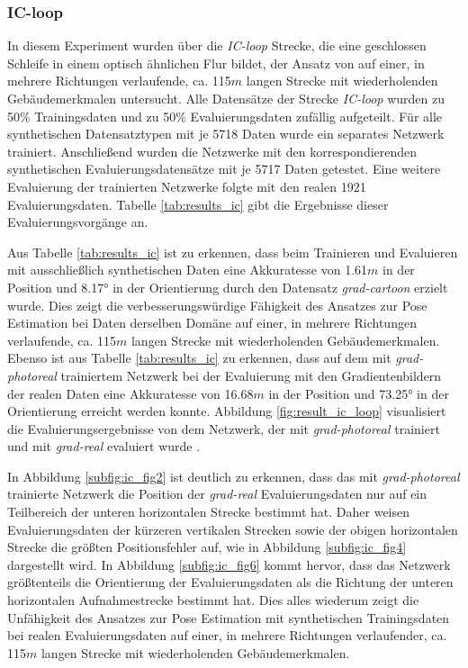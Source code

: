 \subsubsection{IC-loop}
In diesem Experiment wurden über die \textit{IC-loop} Strecke, die eine geschlossen Schleife in einem optisch ähnlichen Flur bildet, der Ansatz von \citet{acharyaBIMPoseNetIndoorCamera2019} auf einer, in mehrere Richtungen verlaufende, ca. 115$m$ langen Strecke mit wiederholenden Gebäudemerkmalen untersucht. Alle Datensätze der Strecke \textit{IC-loop} wurden zu 50\% Trainingsdaten und zu 50\% Evaluierungsdaten zufällig aufgeteilt. Für alle synthetischen Datensatztypen mit je 5718 Daten wurde ein separates Netzwerk trainiert. Anschließend wurden die Netzwerke mit den korrespondierenden synthetischen Evaluierungsdatensätze mit je 5717 Daten getestet. Eine weitere Evaluierung der trainierten Netzwerke folgte mit den realen 1921 Evaluierungsdaten. Tabelle \ref{tab:results_ic} gibt die Ergebnisse dieser Evaluierungsvorgänge an.

Aus Tabelle \ref{tab:results_ic} ist zu erkennen, dass beim Trainieren und Evaluieren mit ausschließlich synthetischen Daten eine Akkuratesse von 1.61$m$ in der Position und 8.17° in der Orientierung  durch den Datensatz \textit{grad-cartoon} erzielt wurde. Dies zeigt die verbesserungswürdige Fähigkeit des Ansatzes zur Pose Estimation bei Daten derselben Domäne auf einer, in mehrere Richtungen verlaufende, ca. 115$m$ langen Strecke mit wiederholenden Gebäudemerkmalen. Ebenso ist aus Tabelle \ref{tab:results_ic} zu erkennen, dass auf dem mit \textit{grad-photoreal} trainiertem Netzwerk bei der Evaluierung mit den Gradientenbildern der realen Daten eine Akkuratesse von 16.68$m$ in der Position und 73.25° in der Orientierung erreicht werden konnte. Abbildung \ref{fig:result_ic_loop} visualisiert die Evaluierungsergebnisse von dem Netzwerk, der mit \textit{grad-photoreal} trainiert und mit \textit{grad-real} evaluiert wurde .

In Abbildung \ref{subfig:ic_fig2} ist deutlich zu erkennen, dass das mit \textit{grad-photoreal} trainierte Netzwerk die Position der \textit{grad-real} Evaluierungsdaten nur auf ein Teilbereich der unteren horizontalen Strecke bestimmt hat. Daher weisen Evaluierungsdaten der kürzeren vertikalen Strecken sowie der obigen horizontalen Strecke die größten Positionsfehler auf, wie in Abbildung \ref{subfig:ic_fig4} dargestellt wird. In Abbildung \ref{subfig:ic_fig6} kommt hervor, dass das Netzwerk größtenteils die Orientierung der Evaluierungsdaten als die Richtung der unteren horizontalen Aufnahmestrecke bestimmt hat. Dies alles wiederum zeigt die Unfähigkeit des Ansatzes zur Pose Estimation mit synthetischen Trainingsdaten bei realen Evaluierungsdaten auf einer, in mehrere Richtungen verlaufender, ca. 115$m$ langen Strecke mit wiederholenden Gebäudemerkmalen.

